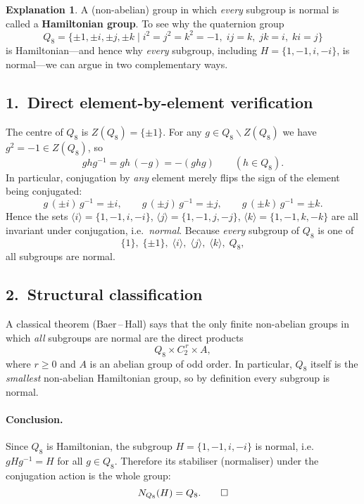 \documentclass[12pt]{article}
\theoremstyle{definition} %
\newtheorem{explanation}{Explanation}
\theoremstyle{plain} %
\begin{document}
\begin{explanation}
  A (non-abelian) group in which \emph{every} subgroup is normal is called
  a \textbf{Hamiltonian group}.
  To see why the quaternion group
  \[
    Q_8=\{\pm1,\pm i,\pm j,\pm k\mid i^2=j^2=k^2=-1,\;
           ij=k,\; jk=i,\; ki=j\}
  \]
  is Hamiltonian—and hence why \emph{every} subgroup, including
  $H=\{1,-1,i,-i\}$, is normal—we can argue in two complementary ways.

  \subsection*{1.\  Direct element-by-element verification}
  The centre of $Q_8$ is $Z(Q_8)=\{\pm1\}$.  
  For any $g\in Q_8\smallsetminus Z(Q_8)$ we have
  $g^2=-1\in Z(Q_8)$, so
  \[
      g h g^{-1}=g h\,(-g)=-(ghg)\qquad(h\in Q_8).
  \]
  In particular, conjugation by \emph{any} element merely flips the sign
  of the element being conjugated:
  \[
     g\,(\pm i)\,g^{-1}=\pm i,\qquad
     g\,(\pm j)\,g^{-1}=\pm j,\qquad
     g\,(\pm k)\,g^{-1}=\pm k.
  \]
  Hence the sets
  $\langle i\rangle=\{1,-1,i,-i\}$,
  $\langle j\rangle=\{1,-1,j,-j\}$,
  $\langle k\rangle=\{1,-1,k,-k\}$
  are all invariant under conjugation, i.e.\ \emph{normal}.
  Because \emph{every} subgroup of $Q_8$ is one of
  \[
    \{1\},\;
    \{\pm1\},\;
    \langle i\rangle,\;
    \langle j\rangle,\;
    \langle k\rangle,\;
    Q_8,
  \]
  all subgroups are normal.

  \subsection*{2.\  Structural classification}
  A classical theorem (Baer\,–\,Hall) says that the only finite
  non-abelian groups in which \emph{all} subgroups are normal are the
  direct products
  \[
     Q_8\times C_2^{\,r}\times A,
  \]
  where $r\ge 0$ and $A$ is an abelian group of odd order.
  In particular, $Q_8$ itself is the \emph{smallest} non-abelian
  Hamiltonian group, so by definition every subgroup is normal.

  \paragraph{Conclusion.}
  Since $Q_8$ is Hamiltonian, the subgroup
  $H=\{1,-1,i,-i\}$ is normal, i.e.
  $gHg^{-1}=H$ for all $g\in Q_8$.
  Therefore its stabiliser (normaliser) under the conjugation action is
  the whole group:
  \[
     N_{Q_8}(H)=Q_8.\qedhere
  \]
\end{explanation}
\end{document}
